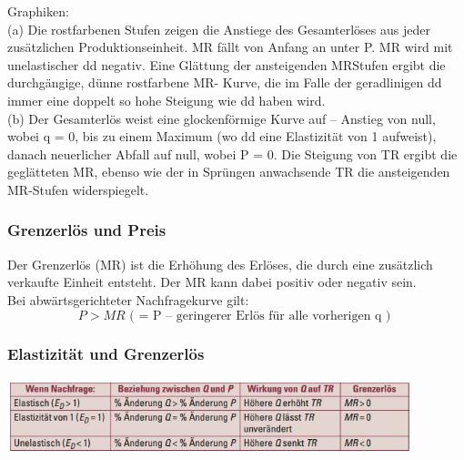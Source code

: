 \documentclass[10pt]{scrartcl}
\begin{document}
Graphiken:\\
(a) Die rostfarbenen Stufen zeigen die Anstiege des Gesamterlöses aus jeder zusätzlichen Produktionseinheit. MR fällt von Anfang an unter P. MR wird mit unelastischer dd negativ. Eine Glättung der ansteigenden MRStufen ergibt die durchgängige, dünne rostfarbene MR- Kurve, die im Falle der geradlinigen dd immer eine doppelt so hohe Steigung wie dd haben wird.\\
(b) Der Gesamterlös weist eine glockenförmige Kurve auf – Anstieg von null, wobei q = 0, bis zu einem Maximum (wo dd eine Elastizität von 1 aufweist), danach neuerlicher Abfall auf null, wobei P = 0. Die Steigung von TR ergibt die geglätteten MR, ebenso wie der in Sprüngen anwachsende TR die ansteigenden MR-Stufen widerspiegelt.

\subsubsection{Grenzerlös und Preis}
Der Grenzerlös (MR) ist die Erhöhung des Erlöses, die durch eine zusätzlich verkaufte Einheit entsteht. Der MR kann dabei positiv oder negativ sein.\\
Bei abwärtsgerichteter Nachfragekurve gilt:
\begin{equation}
P > MR \text{ ( = P – geringerer Erlös für alle vorherigen q ) } \nonumber
\end{equation}
\subsubsection{Elastizität und Grenzerlös}
\includegraphics[width=0.88\textwidth]{img/grenzerlos_elas.jpg}
\end{document}
